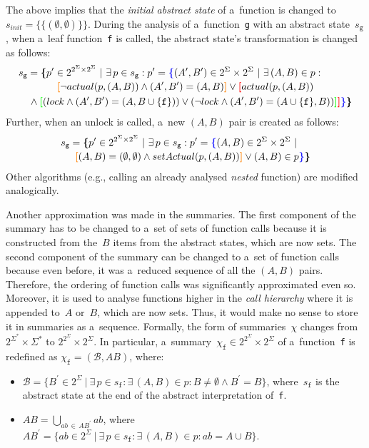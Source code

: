The above implies that the \emph{initial abstract state} of a~function is changed to $ s_{init} = \{\{(\emptyset, \emptyset)\}\} $. During the analysis of a~function~\texttt{g} with an abstract state~$ s_\mathtt{g} $, when a~leaf function~\texttt{f} is called, the abstract state's transformation is changed as follows: 
$$
\begin{multlined}
    s_\mathtt{g} = \bb{\{}p^\prime \in 2^{2^\Sigma \times 2^\Sigma}\ |\ \exists\,p \in s_\mathtt{g} : p^\prime = \bA{\{}(A^\prime, B^\prime) \in 2^\Sigma \times 2^\Sigma\ |\ \exists\,(A, B) \in p : \\
%
    \bB{[}\neg actual(p, (A, B)) \wedge (A^\prime, B^\prime) = (A, B)\bB{]} \vee \bC{[}actual(p, (A, B)) \\
%
    \wedge \bD{[}(lock \wedge (A^\prime, B^\prime) = (A, B \cup \{\mathtt{f}\})) \vee (\neg lock \wedge (A^\prime, B^\prime) = (A \cup \{\mathtt{f}\}, B))%
%
    \bD{]}\bC{]}\bA{\}}\bb{\}}
\end{multlined}
$$
Further, when an unlock is called, a~new $ (A, B) $ pair is created as follows: 
$$
\begin{multlined}
    s_\mathtt{g} = \bb{\{}p^\prime \in 2^{2^\Sigma \times 2^\Sigma}\ |\ \exists\,p \in s_\mathtt{g} : p^\prime = \bA{\{}(A, B) \in 2^\Sigma \times 2^\Sigma\ |\ \\
%
    \bB{[}(A, B) = (\emptyset, \emptyset) \wedge setActual(p, (A, B))\bB{]} \vee (A, B) \in p%
%
    \bA{\}}\bb{\}}
\end{multlined}
$$
Other algorithms (e.g., calling an already analysed \emph{nested} function) are modified analogically.

Another approximation was made in the summaries. The first component of the summary has to be changed to a~set of sets of function calls because it is constructed from the~$ B $ items from the abstract states, which are now sets. The second component of the summary can be changed to a~set of function calls because even before, it was a~reduced sequence of all the $ (A, B) $ pairs. Therefore, the ordering of function calls was significantly approximated even so. Moreover, it is used to analyse functions higher in the \emph{call hierarchy} where it is appended to~$ A $ or~$ B $, which are now sets. Thus, it would make no sense to store it in summaries as a~sequence. Formally, the form of summaries~$ \chi $ changes from $ 2^{\Sigma^*} \times \Sigma^* $ to $ 2^{2^\Sigma} \times 2^\Sigma $. In particular, a~summary~$ \chi_\mathtt{f} \in 2^{2^\Sigma} \times 2^\Sigma $ of a~function~\texttt{f} is redefined as $ \chi_\mathtt{f} = (\mathcal{B}, AB) $, where:
\begin{itemize}
    \item $ \mathcal{B} = \{B^\prime \in 2^\Sigma\ |\ \exists\,p \in s_\mathtt{f} : \exists\,(A, B) \in p : B \neq \emptyset \wedge B^\prime = B\} $, where~$ s_\mathtt{f} $ is the abstract state at the end of the abstract interpretation of~\texttt{f}.
        
    \item $ AB = \bigcup\limits_{ab\,\in\,AB^\prime} ab $, where $ AB^\prime = \{ab \in 2^\Sigma\ |\ \exists\,p \in s_\mathtt{f} : \exists\,(A, B) \in p: ab = A \cup B\} $.
\end{itemize}

